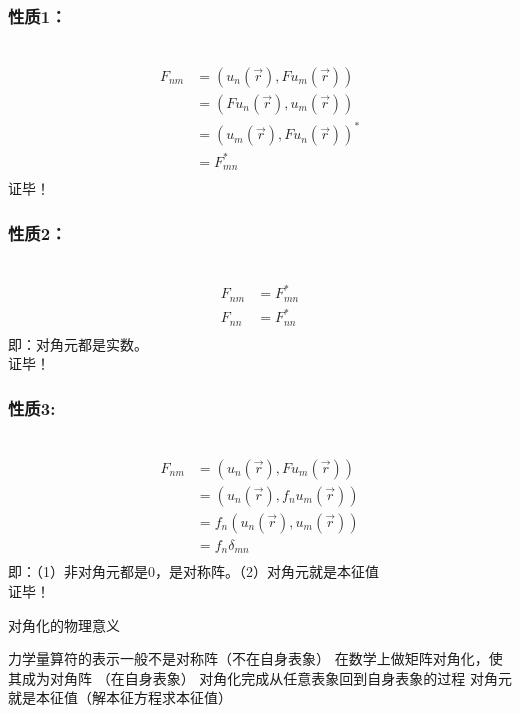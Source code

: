 \begin{frame}
    \frametitle{性质1：}
    \例[6.试证明力学量算符的矩阵表示都是厄密矩阵]{}
    \证~ 
    \begin{equation*}
        \begin{split}
            F_{nm}&=(u_n (\vec{r}), Fu_m(\vec{r}))\\
            &=(Fu_n (\vec{r}), u_m(\vec{r}))\\
            &=(u_m(\vec{r}), Fu_n (\vec{r}))^*\\
            &=F_{mn}^*\\
        \end{split} 
    \end{equation*}
    证毕！
\end{frame}

\begin{frame}
    \frametitle{性质2：}
    \证~ 
    \begin{equation*}
        \begin{split}
            F_{nm}&=F_{mn}^*\\
            F_{nn}&=F_{nn}^*\\
        \end{split} 
    \end{equation*}
    即：对角元都是实数。 \\
    证毕！
\end{frame}

\begin{frame}
    \frametitle{性质3:}
    \证~ 
    \begin{equation*}
        \begin{split}
            F_{nm}&=(u_n (\vec{r}), Fu_m(\vec{r}))\\
            &=(u_n (\vec{r}), f_nu_m(\vec{r}))\\
            &=f_n(u_n (\vec{r}), u_m(\vec{r}))\\
            &=f_n\delta_{mn}\\
        \end{split} 
    \end{equation*}
    即：（1）非对角元都是0，是对称阵。（2）对角元就是本征值\\
    证毕！
\end{frame}

\begin{frame} [allowframebreaks=]
    \begin{tcolorbox2}{对角化的物理意义}
        \begin{itemize}
            \Item 力学量算符的表示一般不是对称阵（不在自身表象）
            \Item 在数学上做矩阵对角化，使其成为对角阵 （在自身表象）
            \Item 对角化完成从任意表象回到自身表象的过程
            \Item 对角元就是本征值（解本征方程求本征值）
        \end{itemize}  
    \end{tcolorbox2}
\end{frame}

